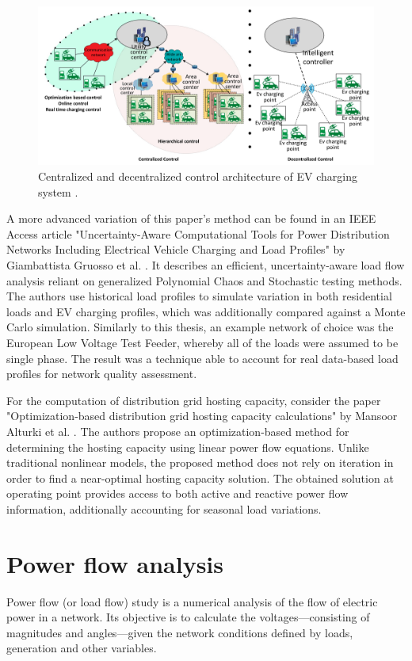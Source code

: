\documentclass[a4paper,10pt]{report}
\begin{document}
\begin{figure}[htpb]
	\centering
	\includegraphics[width=\linewidth]{centralized_vs_decentr_ctrl}
	\caption[Centralized and decentralized control architecture]{Centralized and decentralized control architecture of EV charging system \cite{Das2020}.}
	\label{centralized_vs_decentr_ctrl}
\end{figure}

A more advanced variation of this paper's method can be found in an IEEE Access article "Uncertainty-Aware Computational Tools for Power Distribution Networks Including Electrical Vehicle Charging and Load Profiles" by Giambattista Gruosso et al. \cite{Gruosso2019}. It describes an efficient, uncertainty-aware load flow analysis reliant on generalized Polynomial Chaos and Stochastic testing methods. The authors use historical load profiles to simulate variation in both residential loads and EV charging profiles, which was additionally compared against a Monte Carlo simulation. Similarly to this thesis, an example network of choice was the European Low Voltage Test Feeder, whereby all of the loads were assumed to be single phase. The result was a technique able to account for real data-based load profiles for network quality assessment.

For the computation of distribution grid hosting capacity, consider the paper "Optimization-based distribution grid hosting capacity calculations" by Mansoor Alturki et al. \cite{Alturki2018}. The authors propose an optimization-based method for determining the hosting capacity using linear power flow equations. Unlike traditional nonlinear models, the proposed method does not rely on iteration in order to find a near-optimal hosting capacity solution. The obtained solution at operating point provides access to both active and reactive power flow information, additionally accounting for seasonal load variations.

\section{Power flow analysis}
Power flow (or load flow) study is a numerical analysis of the flow of electric power in a network. Its objective is to calculate the voltages---consisting of magnitudes and angles---given the network conditions defined by loads, generation and other variables.
\end{document}
